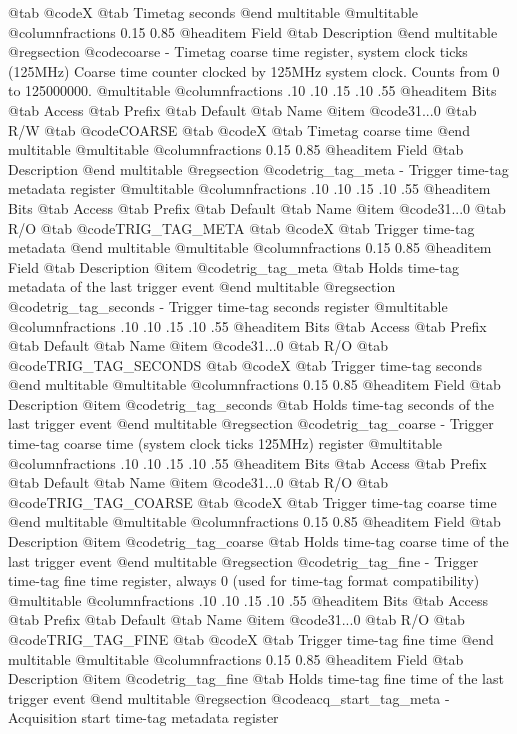 @tab @code{X} @tab 
Timetag seconds
@end multitable
@multitable @columnfractions 0.15 0.85
@headitem Field @tab Description
@end multitable
@regsection @code{coarse} - Timetag coarse time register, system clock ticks (125MHz)
Coarse time counter clocked by 125MHz system clock.
Counts from 0 to 125000000.
@multitable @columnfractions .10 .10 .15 .10 .55
@headitem Bits @tab Access @tab Prefix @tab Default @tab Name
@item @code{31...0}
@tab R/W @tab
@code{COARSE}
@tab @code{X} @tab 
Timetag coarse time
@end multitable
@multitable @columnfractions 0.15 0.85
@headitem Field @tab Description
@end multitable
@regsection @code{trig_tag_meta} - Trigger time-tag metadata register
@multitable @columnfractions .10 .10 .15 .10 .55
@headitem Bits @tab Access @tab Prefix @tab Default @tab Name
@item @code{31...0}
@tab R/O @tab
@code{TRIG_TAG_META}
@tab @code{X} @tab 
Trigger time-tag metadata
@end multitable
@multitable @columnfractions 0.15 0.85
@headitem Field @tab Description
@item @code{trig_tag_meta} @tab Holds time-tag metadata of the last trigger event
@end multitable
@regsection @code{trig_tag_seconds} - Trigger time-tag seconds register
@multitable @columnfractions .10 .10 .15 .10 .55
@headitem Bits @tab Access @tab Prefix @tab Default @tab Name
@item @code{31...0}
@tab R/O @tab
@code{TRIG_TAG_SECONDS}
@tab @code{X} @tab 
Trigger time-tag seconds
@end multitable
@multitable @columnfractions 0.15 0.85
@headitem Field @tab Description
@item @code{trig_tag_seconds} @tab Holds time-tag seconds of the last trigger event
@end multitable
@regsection @code{trig_tag_coarse} - Trigger time-tag coarse time (system clock ticks 125MHz) register
@multitable @columnfractions .10 .10 .15 .10 .55
@headitem Bits @tab Access @tab Prefix @tab Default @tab Name
@item @code{31...0}
@tab R/O @tab
@code{TRIG_TAG_COARSE}
@tab @code{X} @tab 
Trigger time-tag coarse time
@end multitable
@multitable @columnfractions 0.15 0.85
@headitem Field @tab Description
@item @code{trig_tag_coarse} @tab Holds time-tag coarse time of the last trigger event
@end multitable
@regsection @code{trig_tag_fine} - Trigger time-tag fine time register, always 0 (used for time-tag format compatibility)
@multitable @columnfractions .10 .10 .15 .10 .55
@headitem Bits @tab Access @tab Prefix @tab Default @tab Name
@item @code{31...0}
@tab R/O @tab
@code{TRIG_TAG_FINE}
@tab @code{X} @tab 
Trigger time-tag fine time
@end multitable
@multitable @columnfractions 0.15 0.85
@headitem Field @tab Description
@item @code{trig_tag_fine} @tab Holds time-tag fine time of the last trigger event
@end multitable
@regsection @code{acq_start_tag_meta} - Acquisition start time-tag metadata register
